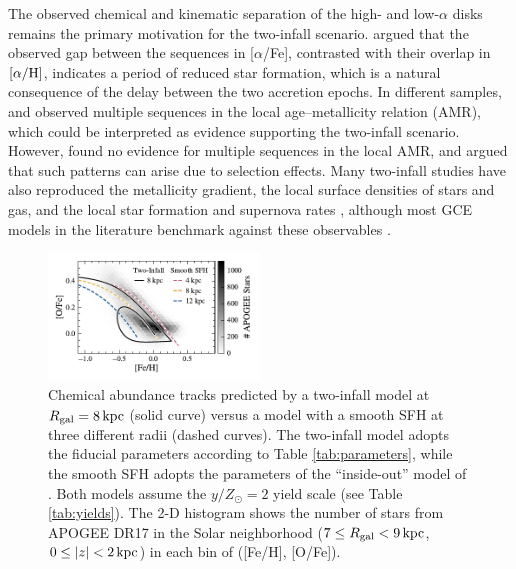 \documentclass[twocolumn,twocolappendix,linenumbers]{aastex631}
\newcommand{\aFe}{[$\alpha$/Fe]\xspace}
\newcommand{\yZ}[1]{$y/Z_\odot=#1$}
\newcommand{\kpc}{\,{\rm kpc}}
\begin{document}
The observed chemical and kinematic separation of the high- and low-$\alpha$ disks remains the primary motivation for the two-infall scenario. \citet{spitoni_remind_2024} argued that the observed gap between the sequences in \aFe, contrasted with their overlap in $[\alpha/{\rm H}]$, indicates a period of reduced star formation, which is a natural consequence of the delay between the two accretion epochs. In different samples, \citet{nissen_high-precision_2020} and \citet{nataf_accurate_2024} observed multiple sequences in the local age--metallicity relation (AMR), which could be interpreted as evidence supporting the two-infall scenario. However, \citet{plotnikova_chemical_2024} found no evidence for multiple sequences in the local AMR, and argued that such patterns can arise due to selection effects. Many two-infall studies have also reproduced the metallicity gradient, the local surface densities of stars and gas, and the local star formation and supernova rates \citep[e.g.,][]{chiappini_chemical_1997,romano_mass_2000,spitoni_remind_2024}, although most GCE models in the literature benchmark against these observables \citep[e.g.,][]{minchev_chemodynamical_2013,johnson_stellar_2021}.

\begin{figure}
    \centering
    \includegraphics[width=0.5\textwidth]{figures/smooth_vs_twoinfall.pdf}
    \caption{Chemical abundance tracks predicted by a two-infall model at $R_{\rm gal}=8\kpc$ (solid curve) versus a model with a smooth SFH at three different radii (dashed curves). The two-infall model adopts the fiducial parameters according to Table \ref{tab:parameters}, while the smooth SFH adopts the parameters of the ``inside-out'' model of \citet{johnson_stellar_2021}. Both models assume the \yZ{2} yield scale (see Table \ref{tab:yields}). The 2-D histogram shows the number of stars from APOGEE DR17 in the Solar neighborhood ($7\leq R_{\rm gal}<9\kpc$, $0\leq|z|<2\kpc$) in each bin of ([Fe/H], [O/Fe]).}
    \label{fig:smooth-vs-twoinfall}
\end{figure}
\end{document}
